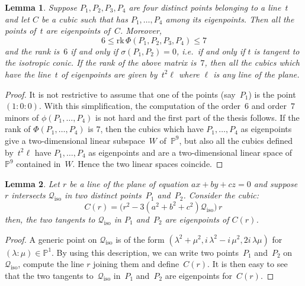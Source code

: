 \documentclass[a4paper, 11pt, reqno]{amsart}
\theoremstyle{plain}
\newtheorem{lemma}{Lemma}[section]
\theoremstyle{definition}
\newcommand{\p}{\mathbb{P}}
\newcommand{\iii}{\textit{i}\,}
\newcommand{\rk}{\ensuremath{\mathrm{rk}}}
\newcommand{\iso}{\mathcal{Q}_{\mathrm{iso}}}
\begin{document}
\begin{lemma}
\label{4ptiSuRetta2}
Suppose $P_1, P_2, P_3, P_4$ are four distinct points belonging to a line~$t$
and let $C$ be a cubic such that has $P_1, \dots, P_4$ among its eigenpoints.
Then all the points of~$t$ are eigenpoints of~$C$.
Moreover,
%
\begin{equation*}
  6 \leq \rk \,\Phi(P_1, P_2, P_3, P_4) \leq 7
\end{equation*}
%
and the rank is~$6$ if and only if $\sigma(P_1, P_2) = 0$, i.e.\ if
and only if $t$ is tangent to the isotropic conic. If the rank of
the above matrix is~$7$, then all the cubics which have the line~$t$
of eigenpoints are given by~$t^2 \ell$ where $\ell$ is any line of the plane.
\end{lemma}
\begin{proof}
It is not restrictive to assume that one of the points (say~$P_1$) is
the point~$(1: 0: 0)$.
With this simplification, the computation of the order~$6$ and order~$7$
minors of $\phi(P_1, \dots, P_4)$ is not hard and
the first part of the thesis follows. If the rank of $\Phi(P_1, \dots, P_4)$
is $7$, then the cubics which have $P_1, \dots, P_4$ as eigenpoints
give a two-dimensional linear subspace~$W$ of~$\p^9$, but also all
the cubics defined by~$t^2 \ell$ have $P_1, \dots, P_4$ as eigenpoints and are
a two-dimensional linear space of~$\p^9$ contained in~$W$. Hence the two linear
spaces coincide.
\end{proof}

\begin{lemma}
\label{lemma: twoTangentsCiso} Let $r$ be a line of the plane of
equation $ax+by+cz=0$ and suppose $r$ intersects $\iso$ in two distinct points~$P_1$ and~$P_2$. Consider the cubic:
\begin{equation}
\label{2_lines_of_eigenpoints}
  C(r) = \bigl( r^2-3\left(a^2+b^2+c^2\right)\iso \bigr) \, r \,
\end{equation}
then, the two tangents to $\iso$ in $P_1$ and~$P_2$ are eigenpoints of 
$C(r)$.
\end{lemma}
\begin{proof}
A generic point on $\iso$ is of the form $(\lambda^2 + \mu^2, 
\iii\lambda^2 -\iii\mu^2, 2\iii\lambda \mu)$ for $(\lambda: \mu) \in \p^1$.
By using this description, we can write two points~$P_1$ and~$P_2$ on~$\iso$,
compute the line $r$ joining them and define~$C(r)$.
It is then easy to see that the two tangents to~$\iso$ in~$P_1$ and~$P_2$ are eigenpoints
for~$C(r)$.
\end{proof}
\end{document}

